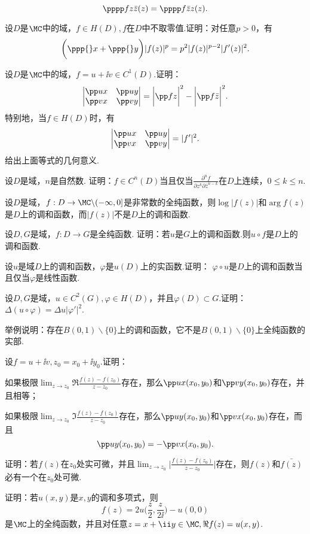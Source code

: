 \begin{xiti}
     \[
       \pppp fz{\bar z}(z) = \pppp f{\bar z}z(z).
     \]
  \item 设$D$是$\MC$中的域，$f\in H(D),f$在$D$中不取零值.证明：对任意$p>0$，有
     \[
       \bigg(\ppp{}x + \ppp{}y\bigg)|f(z)|^p = p^2|f(z)|^{p-2} |f'(z)|^2.
     \]
  \item 设$D$是$\MC$中的域，$f=u+\ii v\in C^1(D)$.证明：
     \[
       \begin{vmatrix}
         \pp ux & \pp uy\\
         \pp vx & \pp vy
       \end{vmatrix}
       = \bigg| \pp fz \bigg|^2 - \bigg| \pp f{\bar z} \bigg|^2.
     \]
     特别地，当$f\in H(D)$时，有
     \[
       \begin{vmatrix}
         \pp ux & \pp uy \\
         \pp vx & \pp vy
       \end{vmatrix} = |f'|^2.
     \]
     给出上面等式的几何意义.
  \item 设$D$是域，$n$是自然数. 证明：$f\in C^n(D)$当且仅当$\frac{\partial^nf}{\partial z^k\partial\bar z^{n-k}}$在$D$上连续，$0\le k\le n$.
  \item 设$D$是域，$f:D\to\MC\backslash(-\infty,0]$是非常数的全纯函数，则$\log |f(z)|$和$\arg f(z)$是$D$上的调和函数，而$|f(z)|$不是$D$上的调和函数.
  \item 设$D,G$是域，$f:D\to G$是全纯函数. 证明：若$u$是$G$上的调和函数.则$u\circ f$是$D$上的调和函数.
  \item 设$u$是域$D$上的调和函数，$\varphi$是$u(D)$上的实函数.证明：
       $\varphi\circ u$是$D$上的调和函数当且仅当$\varphi$是线性函数.
  \item 设$D,G$是域，$u\in C^2(G),\varphi\in H(D)$，并且$\varphi(D)\subset G$.证明：$\Delta (u\circ \varphi)=\Delta u|\varphi'|^2$.
  \item 举例说明：存在$B(0,1)\backslash\{0\}$上的调和函数，它不是$B(0,1)\backslash\{0\}$上全纯函数的实部.
  \item 设$f=u+\ii v,z_0=x_0+\ii y_0$.证明：
    \begin{enuma}
      \item 如果极限$\lim_{z\to z_0}\Re\frac{f(z)-f(z_0)}{z-z_0}$存在，那么$\pp ux(x_0,y_0)$和$\pp vy(x_0,y_0)$存在，并且相等；
      \item 如果极限$\lim_{z\to z_0}\Im\frac{f(z)-f(z_0)}{z-z_0}$存在，那么$\pp uy(x_0,y_0)$和$\pp vx(x_0,y_0)$存在，而且
          \[
           \pp uy(x_0,y_0) = -\pp vx(x_0,y_0).
          \]
    \end{enuma}
  \item 证明：若$f(z)$在$z_0$处实可微，并且$\lim_{z\to z_0}\bigg|\frac{f(z)-f(z_0)}{z-z_0}\bigg|$存在，则$f(z)$和$\bar{f(z)}$必有一个在$z_0$处可微.
  \item 证明：若$u(x,y)$是$x,y$的调和多项式，则
     \[
       f(z) = 2u\bigg( \frac z2,\frac z{2\ii} \bigg) - u(0,0)
     \]
     是$\MC$上的全纯函数，并且对任意$z=x+\ii y\in\MC,\Re f(z)=u(x,y)$.
\end{xiti}

